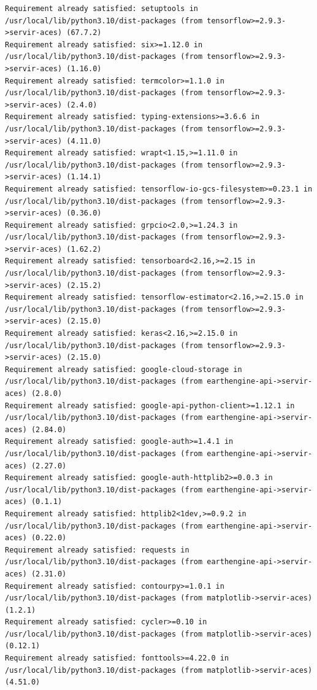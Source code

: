 \documentclass[
  letterpaper,
  DIV=11,
  numbers=noendperiod]{scrreprt}
\begin{document}
\begin{verbatim}
Requirement already satisfied: setuptools in /usr/local/lib/python3.10/dist-packages (from tensorflow>=2.9.3->servir-aces) (67.7.2)
Requirement already satisfied: six>=1.12.0 in /usr/local/lib/python3.10/dist-packages (from tensorflow>=2.9.3->servir-aces) (1.16.0)
Requirement already satisfied: termcolor>=1.1.0 in /usr/local/lib/python3.10/dist-packages (from tensorflow>=2.9.3->servir-aces) (2.4.0)
Requirement already satisfied: typing-extensions>=3.6.6 in /usr/local/lib/python3.10/dist-packages (from tensorflow>=2.9.3->servir-aces) (4.11.0)
Requirement already satisfied: wrapt<1.15,>=1.11.0 in /usr/local/lib/python3.10/dist-packages (from tensorflow>=2.9.3->servir-aces) (1.14.1)
Requirement already satisfied: tensorflow-io-gcs-filesystem>=0.23.1 in /usr/local/lib/python3.10/dist-packages (from tensorflow>=2.9.3->servir-aces) (0.36.0)
Requirement already satisfied: grpcio<2.0,>=1.24.3 in /usr/local/lib/python3.10/dist-packages (from tensorflow>=2.9.3->servir-aces) (1.62.2)
Requirement already satisfied: tensorboard<2.16,>=2.15 in /usr/local/lib/python3.10/dist-packages (from tensorflow>=2.9.3->servir-aces) (2.15.2)
Requirement already satisfied: tensorflow-estimator<2.16,>=2.15.0 in /usr/local/lib/python3.10/dist-packages (from tensorflow>=2.9.3->servir-aces) (2.15.0)
Requirement already satisfied: keras<2.16,>=2.15.0 in /usr/local/lib/python3.10/dist-packages (from tensorflow>=2.9.3->servir-aces) (2.15.0)
Requirement already satisfied: google-cloud-storage in /usr/local/lib/python3.10/dist-packages (from earthengine-api->servir-aces) (2.8.0)
Requirement already satisfied: google-api-python-client>=1.12.1 in /usr/local/lib/python3.10/dist-packages (from earthengine-api->servir-aces) (2.84.0)
Requirement already satisfied: google-auth>=1.4.1 in /usr/local/lib/python3.10/dist-packages (from earthengine-api->servir-aces) (2.27.0)
Requirement already satisfied: google-auth-httplib2>=0.0.3 in /usr/local/lib/python3.10/dist-packages (from earthengine-api->servir-aces) (0.1.1)
Requirement already satisfied: httplib2<1dev,>=0.9.2 in /usr/local/lib/python3.10/dist-packages (from earthengine-api->servir-aces) (0.22.0)
Requirement already satisfied: requests in /usr/local/lib/python3.10/dist-packages (from earthengine-api->servir-aces) (2.31.0)
Requirement already satisfied: contourpy>=1.0.1 in /usr/local/lib/python3.10/dist-packages (from matplotlib->servir-aces) (1.2.1)
Requirement already satisfied: cycler>=0.10 in /usr/local/lib/python3.10/dist-packages (from matplotlib->servir-aces) (0.12.1)
Requirement already satisfied: fonttools>=4.22.0 in /usr/local/lib/python3.10/dist-packages (from matplotlib->servir-aces) (4.51.0)

\end{verbatim}
\end{document}
